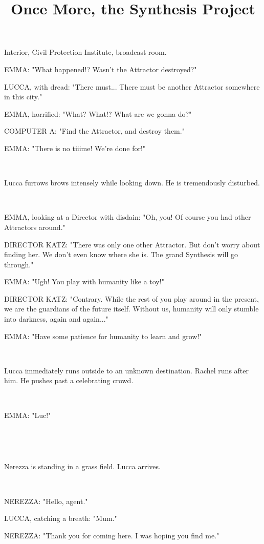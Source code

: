 \documentclass[11pt]{article}
\begin{document}
\ttfamily
\title{Once More, the Synthesis Project}
\maketitle



Interior, Civil Protection Institute, broadcast room. 

EMMA: "What happened!?
Wasn't the Attractor destroyed?"

LUCCA, with dread: "There must...
There must be another Attractor somewhere in this city."

EMMA, horrified: "What? What!? What are we gonna do?"

COMPUTER A: "Find the Attractor, and destroy them."

EMMA: "There is no tiiime! We're done for!"

\ 

Lucca furrows brows intensely while looking down. 
He is tremendously disturbed.

\ 

EMMA, looking at a Director with disdain: "Oh, you! 
Of course you had other Attractors around."

DIRECTOR KATZ: "There was only one other Attractor. 
But don't worry about finding her. 
We don't even know where she is.
The grand Synthesis will go through."

EMMA: "Ugh! You play with humanity like a toy!"

DIRECTOR KATZ: "Contrary. 
While the rest of you play around in the present, we are the guardians of the future itself.
Without us, humanity will only stumble into darkness, again and again..."

EMMA: "Have some patience for humanity to learn and grow!"

\ 

Lucca immediately runs outside to an unknown destination.
Rachel runs after him.
He pushes past a celebrating crowd.

\ 

EMMA: "Luc!"

\ 

\ 

Nerezza is standing in a grass field.
Lucca arrives. 

\ 

NEREZZA: "Hello, agent."

LUCCA, catching a breath: "Mum."

NEREZZA: "Thank you for coming here. 
I was hoping you find me."
\end{document}
